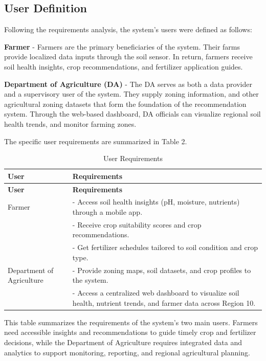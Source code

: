 {	\subsection{User Definition}
	Following the requirements analysis, the system’s users were defined as follows:
	
	\textbf{Farmer} - Farmers are the primary beneficiaries of the system. Their farms provide localized data inputs through the soil sensor. In return, farmers receive soil health insights, crop recommendations, and fertilizer application guides. 
	
	\textbf{Department of Agriculture (DA)} - The DA serves as both a data provider and a supervisory user of the system. They supply zoning information, and other agricultural zoning datasets that form the foundation of the recommendation system. Through the web-based dashboard, DA officials can visualize regional soil health trends, and monitor farming zones.
	
	
	The specific user requirements are summarized in Table 2.
	\begin{longtable}{p{3cm} p{10cm}}
		\caption{User Requirements} \label{tab:UserRequirements} \\
		\toprule
		\textbf{User} & \textbf{Requirements} \\
		\midrule
		\endfirsthead
		
		\toprule
		\textbf{User} & \textbf{Requirements} \\
		\midrule
		\endhead
		
		\bottomrule
		\endfoot
		
		Farmer & - Access soil health insights (pH, moisture, nutrients) through a mobile app. \\
		& - Receive crop suitability scores and crop recommendations. \\
		& - Get fertilizer schedules tailored to soil condition and crop type. \\
		\midrule
		
		Department of Agriculture & - Provide zoning maps, soil datasets, and crop profiles to the system. \\
		& - Access a centralized web dashboard to visualize soil health, nutrient trends, and farmer data across Region 10. \\
	\end{longtable}
	
	This table summarizes the requirements of the system’s two main users. Farmers need accessible insights and recommendations to guide timely crop and fertilizer decisions, while the Department of Agriculture requires integrated data and analytics to support monitoring, reporting, and regional agricultural planning. 
	
}
